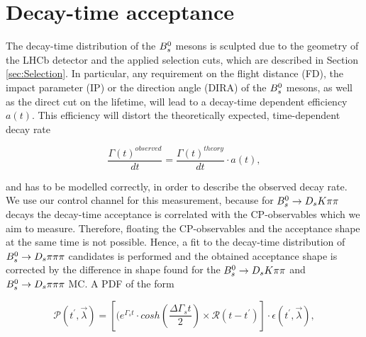 \section{Decay-time acceptance}
\label{sec:Acceptance}
The decay-time distribution of the ${{B}^0_{s}}$ mesons is sculpted due to the geometry of the LHCb detector and the applied selection cuts, which are described in Section \ref{sec:Selection}.
In particular, any requirement on the flight distance (FD), the impact parameter (IP) or the direction angle (DIRA) of the ${{B}^0_{s}}$ mesons, as well as the direct cut on the lifetime, will lead to a decay-time dependent efficiency $a(t)$. This efficiency will distort the theoretically expected, time-dependent decay rate

\begin{equation}
\frac{\Gamma(t)^{observed}}{dt} = \frac{\Gamma(t)^{theory}}{dt} \cdot a(t),
\label{eq:DecRateAcc}
\end{equation} 

and has to be modelled correctly, in order to describe the observed decay rate. We use our control channel for this measurement, because for ${{B}^0_{s}}\rightarrow{\ensuremath{{D}_{s}}}{\ensuremath{K}}{\ensuremath{\pi}}{\ensuremath{\pi}}$ decays the decay-time acceptance is correlated with the CP-observables which we aim to measure. Therefore, floating the CP-observables and the acceptance shape at the same time is not possible. 
Hence, a fit to the decay-time distribution of ${{B}^0_{s}}\rightarrow{\ensuremath{{D}_{s}}}{\ensuremath{\pi}}{\ensuremath{\pi}}{\ensuremath{\pi}}$ candidates is performed and the obtained acceptance shape is corrected by the difference in shape found for the ${{B}^0_{s}}\rightarrow{\ensuremath{{D}_{s}}}{\ensuremath{K}}{\ensuremath{\pi}}{\ensuremath{\pi}}$ and ${{B}^0_{s}}\rightarrow{\ensuremath{{D}_{s}}}{\ensuremath{\pi}}{\ensuremath{\pi}}{\ensuremath{\pi}}$ MC. \newline
A PDF of the form

\begin{equation}
\mathcal{P}(t^{'},\vec{\lambda}) = \left[ (e^{\Gamma_{s}t}\cdot cosh(\frac{\Delta\Gamma_{s}t}{2}) \times \mathcal{R}(t - t^{'})\right] \cdot \epsilon(t^{'}, \vec{\lambda}),
\label{eq:AccPDF}
\end{equation}

